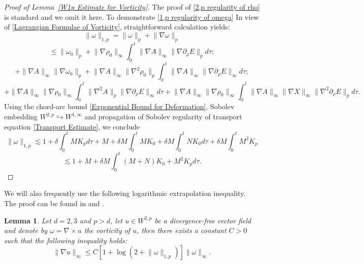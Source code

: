\documentclass[12pt,letterpaper]{article}
\newtheorem{lem}[thm]{Lemma}
\theoremstyle{plain}
\begin{document}
\begin{proof}[Proof of Lemma~\ref{W1p Estimate for Vorticity}]
 The proof of \eqref{2,p regularity of rho} is standard and we omit it here. To demonstrate \eqref{1,p regularity of omega} In view of \eqref{Lagrangian Formulae of Vorticity}, straightforward calculation yields:
 \begin{equation*}
 \lVert\omega\rVert_{1,p}=
\lVert\omega\rVert_p+\lVert\nabla\omega \rVert_p    
 \end{equation*}
 \begin{equation*}
 \le   \lVert \omega_0\rVert_p+\lVert\nabla \rho_0\rVert_\infty \int_0^t \lVert\nabla A\rVert_\infty  \lVert\nabla\partial_\rho E\rVert_p d\tau ;
 \end{equation*}
 \begin{equation*}
 +\lVert\nabla A\rVert_\infty\lVert\nabla\omega_0\rVert_p+\lVert\nabla A\rVert_\infty \lVert\nabla^2\rho_0\rVert_p\int_0^t  \lVert\nabla A\rVert_\infty\lVert\nabla\partial_\rho E\rVert_\infty d\tau ;     
 \end{equation*}
\begin{equation*}
+\lVert\nabla A\rVert_\infty\lVert \nabla \rho_0\rVert_\infty\int_0^t \lVert\nabla^2 A\rVert_p\lVert\nabla\partial_\rho E\rVert_\infty d\tau+\lVert\nabla A\rVert_\infty\lVert\nabla\rho_0\rVert_\infty \int_0^t \lVert\nabla A\rVert_\infty\lVert\nabla X\rVert_\infty \lVert\nabla^2\partial_\rho E\rVert_p d\tau.     
\end{equation*}
Using the chord-arc bound \eqref{Exponential Bound for Deformation},  Sobolev embedding $W^{2,p}\hookrightarrow W^{1,\infty}$ and propagation of Sobolev regularity of transport equation \eqref{Transport Estimate}, we conclude
\begin{equation*}
\lVert\omega\rVert_{1,p}\lesssim 1+\delta\int_0^t MK_p d\tau+M+\delta M\int_0^t MK_0+\delta M\int_0^t NK_0d\tau+\delta M\int_0^t M^2K_p   
\end{equation*}
\begin{equation*}
 \lesssim 1+M+\delta M\int_0^t (M+N)K_0+M^2K_p d\tau  .  
\end{equation*}

    
\end{proof}

We will also frequently use the following logarithmic extrapolation inequality. The proof  can be found in \cite{MajdaBertozzi2002} and \cite{Constantin2017}. 
\begin{lem}\label{Logarithmic Sobolev}
 Let $d=2,3$ and $p>d$, let $u\in W^{2,p}$ be a divergence-free vector field and denote by $\omega=\nabla\times u$ the vorticity of $u$, then there exists a constant $C>0$ such that the following inequality holds:
\begin{equation}\label{Kato Inequality}
\lVert\nabla u\rVert_\infty\le C[1+\log(2+ \lVert\omega\rVert_{1,p})]\lVert\omega\rVert_\infty.
\end{equation}
\end{lem}
\end{document}

